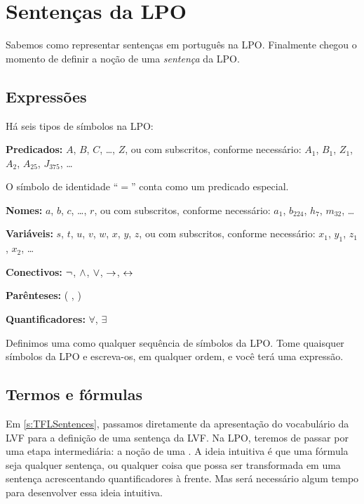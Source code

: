 \chapter{Sentenças da LPO}\label{s:FOLSentences}
Sabemos como representar sentenças em português na LPO. Finalmente chegou o momento de definir a noção de uma \emph{sentença} da LPO.

\section{Expressões}
Há seis tipos de símbolos na LPO:

\begin{compactlist}
\item \textbf{Predicados:} $A$, $B$, $C$, \dots, $Z$, ou com subscritos, conforme necessário: $A_1$, $B_1$, $Z_1$, $A_2$, $A_{25}$, $J_{375}$, \dots



O símbolo de identidade \textquotedblleft $=$\textquotedblright{} conta como um predicado especial.
\item \textbf{Nomes:} $a$, $b$, $c$, \dots, $r$, ou com subscritos, conforme necessário: $a_1$, $b_{224}$, $h_7$, $m_{32}$, \dots

\item \textbf{Variáveis:} $s$, $t$, $u$, $v$, $w$, $x$, $y$, $z$, ou com subscritos, conforme necessário: $x_1$, $y_1$, $z_1$, $x_2$, \dots

\item \textbf{Conectivos:}  $\neg$, $\wedge$, $\vee$, $\rightarrow$, $\leftrightarrow$
\item \textbf{Parênteses:} ( , )
\item \textbf{Quantificadores:}  $\forall$, $\exists$
\end{compactlist}
Definimos uma  como qualquer sequência de símbolos da LPO. Tome quaisquer símbolos da LPO e escreva-os, em qualquer ordem, e você terá uma expressão.

\section{Termos e fórmulas}
\label{s:TermsFormulas}

Em \cref{s:TFLSentences}, passamos diretamente da apresentação do vocabulário da LVF para a definição de uma sentença da LVF. Na LPO, teremos de passar por uma etapa intermediária: a noção de uma . A ideia intuitiva é que uma fórmula seja qualquer sentença, ou qualquer coisa que possa ser transformada em uma sentença acrescentando quantificadores à frente. Mas será necessário algum tempo para desenvolver essa ideia intuitiva.

